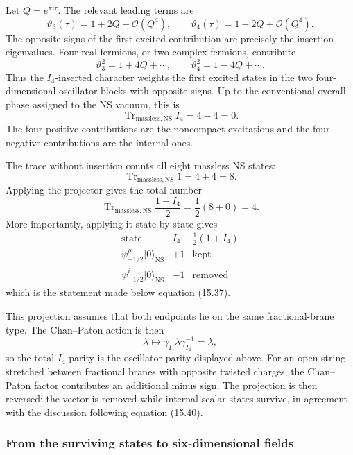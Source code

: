 \documentclass[
  10pt,
  a4paper,
  openany]{book}
\begin{document}
Let \(Q=e^{\pi i\tau}\). The relevant leading terms are \[
\vartheta_3(\tau)
=
1+2Q+\mathcal O(Q^4),
\qquad
\vartheta_4(\tau)
=
1-2Q+\mathcal O(Q^4).
\] The opposite signs of the first excited contribution are precisely
the insertion eigenvalues. Four real fermions, or two complex fermions,
contribute \[
\vartheta_3^2
=
1+4Q+\cdots,
\qquad
\vartheta_4^2
=
1-4Q+\cdots.
\] Thus the \(I_4\)-inserted character weights the first excited states
in the two four-dimensional oscillator blocks with opposite signs. Up to
the conventional overall phase assigned to the NS vacuum, this is \[
\operatorname{Tr}_{\mathrm{massless,NS}}I_4
=
4-4
=
0.
\] The four positive contributions are the noncompact excitations and
the four negative contributions are the internal ones.

The trace without insertion counts all eight massless NS states: \[
\operatorname{Tr}_{\mathrm{massless,NS}}1
=
4+4
=
8.
\] Applying the projector gives the total number \[
\operatorname{Tr}_{\mathrm{massless,NS}}
\frac{1+I_4}{2}
=
\frac12(8+0)
=
4.
\] More importantly, applying it state by state gives \[
\begin{array}{c|c|c}
\text{state}
&I_4
&\frac12(1+I_4)\\ \hline
\psi_{-1/2}^{\mu}|0\rangle_{\mathrm{NS}}
&+1
&\text{kept}\\
\psi_{-1/2}^{i}|0\rangle_{\mathrm{NS}}
&-1
&\text{removed}
\end{array}
\] which is the statement made below equation (15.37).

This projection assumes that both endpoints lie on the same
fractional-brane type. The Chan--Paton action is then \[
\lambda
\longmapsto
\gamma_{I_4}\lambda\gamma_{I_4}^{-1}
=
\lambda,
\] so the total \(I_4\) parity is the oscillator parity displayed above.
For an open string stretched between fractional branes with opposite
twisted charges, the Chan--Paton factor contributes an additional minus
sign. The projection is then reversed: the vector is removed while
internal scalar states survive, in agreement with the discussion
following equation (15.40).

\subsubsection{From the surviving states to six-dimensional
fields}\label{from-the-surviving-states-to-six-dimensional-fields}
\end{document}
